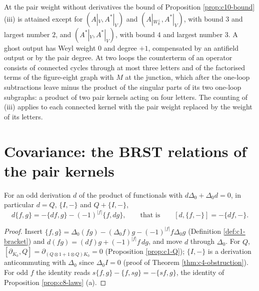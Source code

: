 
\begin{remark}
\label{rem:c10-boundread}
At the pair weight without derivatives the bound of Proposition \ref{prop:c10-bound} (iii) is attained except for $(A|_V,A^*|_V)$ and $(A|_{W_{\mathbb R}^\perp},A^*|_V)$, with bound $3$ and largest number $2$, and $(A^*|_V,A^*|_V)$, with bound $4$ and largest number $3$. A ghost output has Weyl weight $0$ and degree $+1$, compensated by an antifield output or by the pair degree. At two loops the counterterm of an operator consists of connected cycles through at most three letters and of the factorised terms of the figure-eight graph with $M$ at the junction, which after the one-loop subtractions leave minus the product of the singular parts of its two one-loop subgraphs: a product of two pair kernels acting on four letters. The counting of (iii) applies to each connected kernel with the pair weight replaced by the weight of its letters.
\end{remark}

\section{Covariance: the BRST relations of the pair kernels}

\begin{lemma}
\label{lem:c10-deriv}
For an odd derivation $d$ of the product of functionals with $d\Delta_0+\Delta_0d=0$, in particular $d=Q$, $\{I,-\}$ and $Q+\{I,-\}$,
\[
d\{f,g\}=-\{df,g\}-(-1)^{|f|}\{f,dg\},\qquad\text{that is}\qquad [d,\{f,-\}]=-\{df,-\}.
\]
\end{lemma}

\begin{proof}
Insert $\{f,g\}=\Delta_0(fg)-(\Delta_0f)g-(-1)^{|f|}f\Delta_0g$ (Definition \ref{def:c1-bracket}) and $d(fg)=(df)g+(-1)^{|f|}f\,dg$, and move $d$ through $\Delta_0$. For $Q$, $[\partial_{K_0},Q]=\partial_{(Q\otimes1+1\otimes Q)K_0}=0$ (Proposition \ref{prop:c1-Q}); $\{I,-\}$ is a derivation anticommuting with $\Delta_0$ since $\Delta_0I=0$ (proof of Theorem \ref{thm:c4-obstruction}). For odd $f$ the identity reads $s\{f,g\}-\{f,sg\}=-\{sf,g\}$, the identity of Proposition \ref{prop:c8-laws} (a).
\end{proof}

